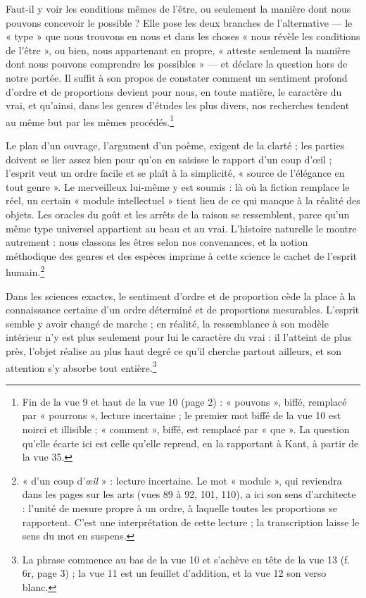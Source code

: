 \documentclass[11pt,a4paper]{article}
\begin{document}
Faut-il y voir les conditions mêmes de l'être, ou seulement la manière dont
nous pouvons concevoir le possible ? Elle pose les deux branches de
l'alternative — le « type » que nous trouvons en nous et dans les choses
« nous révèle les conditions de l'être », ou bien, nous appartenant en propre,
« atteste seulement la manière dont nous pouvons comprendre les possibles » —
et déclare la question hors de notre portée. Il suffit à son propos de
constater comment un sentiment profond d'ordre et de proportions devient pour
nous, en toute matière, le caractère du vrai, et qu'ainsi, dans les genres
d'études les plus divers, nos recherches tendent au même but par les mêmes
procédés.\footnote{Fin de la vue 9 et haut de la vue 10 (page 2) : « pouvons »,
biffé, remplacé par « pourrons », lecture incertaine ; le premier mot biffé de
la vue 10 est noirci et illisible ; « comment », biffé, est remplacé par
« que ». La question qu'elle écarte ici est celle qu'elle reprend, en la
rapportant à Kant, à partir de la vue 35.}

Le plan d'un ouvrage, l'argument d'un poème, exigent de la clarté ; les
parties doivent se lier assez bien pour qu'on en saisisse le rapport d'un coup
d'œil ; l'esprit veut un ordre facile et se plaît à la simplicité, « source de
l'élégance en tout genre ». Le merveilleux lui-même y est soumis : là où la
fiction remplace le réel, un certain « module intellectuel » tient lieu de ce
qui manque à la réalité des objets. Les oracles du goût et les arrêts de la
raison se ressemblent, parce qu'un même type universel appartient au beau et au
vrai. L'histoire naturelle le montre autrement : nous classons les êtres selon
nos convenances, et la notion méthodique des genres et des espèces imprime à
cette science le cachet de l'esprit humain.\footnote{« d'un coup
d'\emph{œil} » : lecture incertaine. Le mot « module », qui reviendra dans les
pages sur les arts (vues 89 à 92, 101, 110), a ici son sens d'architecte :
l'unité de mesure propre à un ordre, à laquelle toutes les proportions se
rapportent. C'est une interprétation de cette lecture ; la transcription
laisse le sens du mot en suspens.}

Dans les sciences exactes, le sentiment d'ordre et de proportion cède la place
à la connaissance certaine d'un ordre déterminé et de proportions mesurables.
L'esprit semble y avoir changé de marche ; en réalité, la ressemblance à son
modèle intérieur n'y est plus seulement pour lui le caractère du vrai : il
l'atteint de plus près, l'objet réalise au plus haut degré ce qu'il cherche
partout ailleurs, et son attention s'y absorbe tout entière.\footnote{La phrase
commence au bas de la vue 10 et s'achève en tête de la vue 13 (f. 6r, page 3) ;
la vue 11 est un feuillet d'addition, et la vue 12 son verso blanc.}
\end{document}
